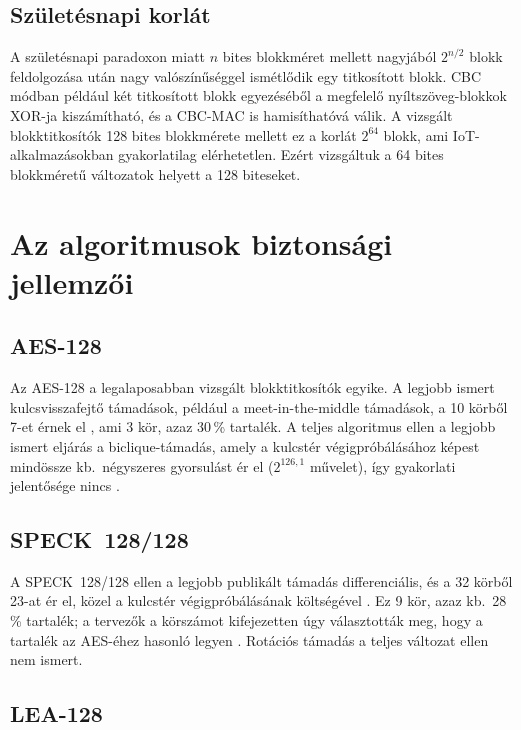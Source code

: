 \documentclass[a4paper,12pt]{report}
\theoremstyle{definition}
\theoremstyle{remark}
\begin{document}
\subsection{Születésnapi korlát}\label{sec:birthday}

A születésnapi paradoxon miatt $n$ bites blokkméret mellett nagyjából $2^{n/2}$ blokk feldolgozása után nagy valószínűséggel ismétlődik egy titkosított blokk. CBC módban például két titkosított blokk egyezéséből a megfelelő nyíltszöveg-blokkok XOR-ja kiszámítható, és a CBC-MAC is hamisíthatóvá válik. A vizsgált blokktitkosítók 128 bites blokkmérete mellett ez a korlát $2^{64}$ blokk, ami IoT-alkalmazásokban gyakorlatilag elérhetetlen. Ezért vizsgáltuk a 64 bites blokkméretű változatok helyett a 128 biteseket.

\section{Az algoritmusok biztonsági jellemzői}\label{sec:alg_security}

\subsection{AES-128}

Az AES-128 a legalaposabban vizsgált blokktitkosítók egyike. A legjobb ismert kulcsvisszafejtő támadások, például a meet-in-the-middle támadások, a 10 körből 7-et érnek el \cite{Derbez2013}, ami 3 kör, azaz 30\,\% tartalék. A teljes algoritmus ellen a legjobb ismert eljárás a biclique-támadás, amely a kulcstér végigpróbálásához képest mindössze kb.\ négyszeres gyorsulást ér el ($2^{126{,}1}$ művelet), így gyakorlati jelentősége nincs \cite{Bogdanov2011}.

\subsection{SPECK~128/128}

A SPECK~128/128 ellen a legjobb publikált támadás differenciális, és a 32 körből 23-at ér el, közel a kulcstér végigpróbálásának költségével \cite{Song2016}. Ez 9 kör, azaz kb.\ 28\,\% tartalék; a tervezők a körszámot kifejezetten úgy választották meg, hogy a tartalék az AES-éhez hasonló legyen \cite{Beaulieu2017}. Rotációs támadás a teljes változat ellen nem ismert.

\subsection{LEA-128}
\end{document}
